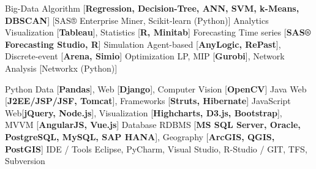 


\begin{cvskills}
    \cvskill
    {Big-Data}
    {Algorithm [\textbf{Regression, Decision-Tree, ANN, SVM, k-Means, DBSCAN}] [{SAS® Enterprise Miner, Scikit-learn (Python)}]}
    \cvskill
    {Analytics}
    {Visualization [\textbf{Tableau}], Statistics [\textbf{R, Minitab}]}    
    \cvskill
    {Forecasting}
    {Time series [\textbf{SAS® Forecasting Studio, R}]}
    \cvskill
    {Simulation}
    {Agent-based [\textbf{AnyLogic, RePast}], Discrete-event [\textbf{Arena, Simio}]}
    \cvskill
    {Optimization}
    {LP, MIP [\textbf{Gurobi}], Network Analysis [Networkx (Python)]}
\end{cvskills}



\begin{cvskills}
    \cvskill
    {Python} 
    {Data [\textbf{Pandas}], Web [\textbf{Django}], Computer Vision [\textbf{OpenCV}]} 
    \cvskill
    {Java} %
    {Web [\textbf{J2EE/JSP/JSF, Tomcat}], Frameworks [\textbf{Struts, Hibernate}]} 
    \cvskill
    {JavaScript} 
    {Web[\textbf{jQuery, Node.js}], Visualization [\textbf{Highcharts, D3.js, Bootstrap}], MVVM [\textbf{AngularJS, Vue.js}]} 
    \cvskill
    {Database} 
    {RDBMS [\textbf{MS SQL Server, Oracle, PostgreSQL, MySQL, SAP HANA}], Geography [\textbf{ArcGIS, QGIS, PostGIS}]}
    \cvskill
    {IDE / Tools} 
    {Eclipse, PyCharm, Visual Studio, R-Studio / GIT, TFS, Subversion}
\end{cvskills}




